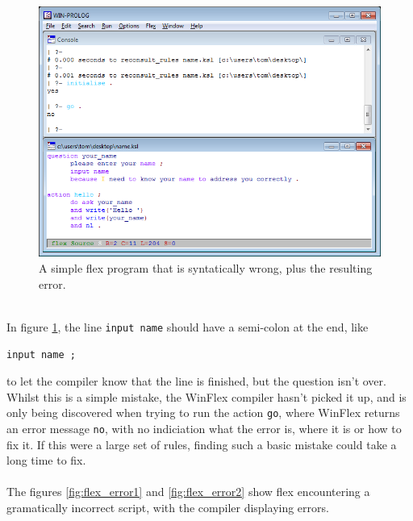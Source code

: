 \documentclass[12pt]{report}
\begin{document}
\begin{figure}[h!]
	\centering
		\includegraphics[scale=0.85]{flexfail}
		\caption{A simple flex program that is syntatically wrong, plus the resulting error.}\label{fig:flexfail}
\end{figure}
\\
In figure \ref{fig:flexfail}, the line \texttt{input name} should have a semi-colon at the end, like 
\begin{center}
\texttt{input name ;}\\
\end{center}
to let the compiler know that the line is finished, but the question isn't over.  Whilst this is a simple mistake, the WinFlex compiler hasn't picked it up, and is only being discovered when trying to run the action \texttt{go}, where WinFlex returns an error message \texttt{no}, with no indiciation what the error is, where it is or how to fix it.  If this were a large set of rules, finding such a basic mistake could take a long time to fix.\\
\\
The figures \ref{fig:flex_error1} and \ref{fig:flex_error2} show flex encountering a gramatically incorrect script, with the compiler displaying errors.
\end{document}
